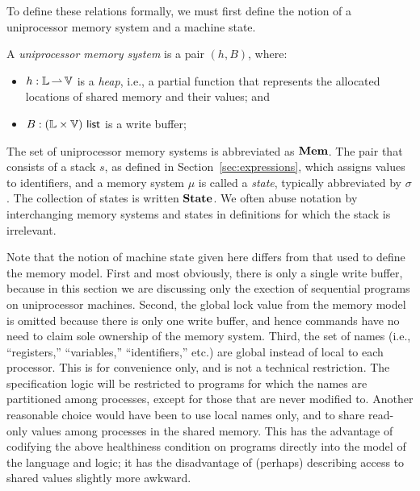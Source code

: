 \documentclass[11pt]{report}
\begin{document}
To define these relations formally, we must first define the notion of a uniprocessor memory system and a machine state. 

\begin{definition}
A \emph{uniprocessor memory system} is a pair $(h,B)$, where: \begin{itemize}
    \item $h : \mathbb{L} \operatorname{\rightharpoonup} \mathbb{V}$ is a \emph{heap}, i.e., a partial function that represents the allocated locations of shared memory and their values; and 
    \item $B : (\mathbb{L} \times \mathbb{V})~\mathsf{list}$ is a write buffer;
\end{itemize}
\end{definition} 
The set of uniprocessor memory systems is abbreviated as $\mathbf{Mem}$.
The pair that consists of a stack $s$, as defined in Section~\ref{sec:expressions}, which assigns values to identifiers, and a memory system $\mu$ is called a \emph{state}, typically abbreviated by $\sigma$. The collection of states is written $\mathbf{State}$. We often abuse notation by interchanging memory systems and states in definitions for which the stack is irrelevant. 

Note that the notion of machine state given here differs from that used to define the memory model. First and most obviously, there is only a single write buffer, because in this section we are discussing only the exection of sequential programs on uniprocessor machines. Second, the global lock value from the memory model is omitted because there is only one write buffer, and hence commands have no need to claim sole ownership of the memory system. Third, the set of names (i.e., ``registers,'' ``variables,'' ``identifiers,'' etc.) are global instead of local to each processor. This is for convenience only, and is not a technical restriction. The specification logic will be restricted to programs for which the names are partitioned among processes, except for those that are never modified to. Another reasonable choice would have been to use local names only, and to share read-only values among processes in the shared memory. This has the advantage of codifying the above healthiness condition on programs directly into the model of the language and logic; it has the disadvantage of (perhaps) describing access to shared values slightly more awkward. 
\end{document}
